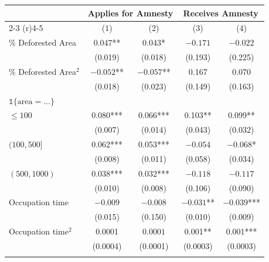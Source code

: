 \documentclass[12pt]{article}
\begin{document}
\clearpage

 \begin{center}
 \begin{threeparttable}[b]
 \singlespacing
 \footnotesize
    	\caption{\textsc{2009 Amnesty Take-Up and Eligibility}}
\setlength{\tabcolsep}{5pt}
\begin{tabular}{l*{4}c}  \midrule \midrule
& \multicolumn{2}{c}{\textbf{Applies for Amnesty}}  & \multicolumn{2}{c}{\textbf{Receives Amnesty}}  %
\\  \cmidrule(r){2-3} \cmidrule(r){4-5} 
  & (1) & (2) & (3) & (4)  \\
   \midrule
\% Deforested Area & 0.047** & 0.043* &  $-0.171$ & $-0.022$ \\ 
& (0.019) & (0.018) & (0.193) & (0.225) \\ 
\% Deforested Area$^2$ & $-0.052$** & $-0.057$** & 0.167 & 0.070 \\ 
& (0.018) & (0.023) & (0.149) & (0.163) \\ 
$\mathbb{1}\{\text{area} = ... \}$  \\ 
\quad $\leq 100$ & 0.080*** & 0.066*** & 0.103** & 0.099** \\
& (0.007) & (0.014) & (0.043) & (0.032) \\ 
\quad $(100, 500]$ & 0.062*** & 0.053*** & $-0.054$ & $-0.068$* \\ 
& (0.008) & (0.011) & (0.058) & (0.034) \\ 
\quad $(500, 1000)$ &  0.038*** & 0.032*** & $-0.118$ & $-0.117$ \\ 
& (0.010) & (0.008) & (0.106) & (0.090) \\ 
Occupation time & $-0.009$ & $-0.008$ & $-0.031$** & $-0.039$*** \\ 
& (0.015) &  (0.150) & (0.010) & (0.009) \\ 
Occupation time$^2$ & 0.0001 & $0.0001$ & 0.001** & 0.001*** \\ 
& (0.0004) & (0.0001) & (0.0003) & (0.0003) \\ 
\\ \midrule

\end{tabular}
\end{threeparttable}
\end{center}
\end{document}

